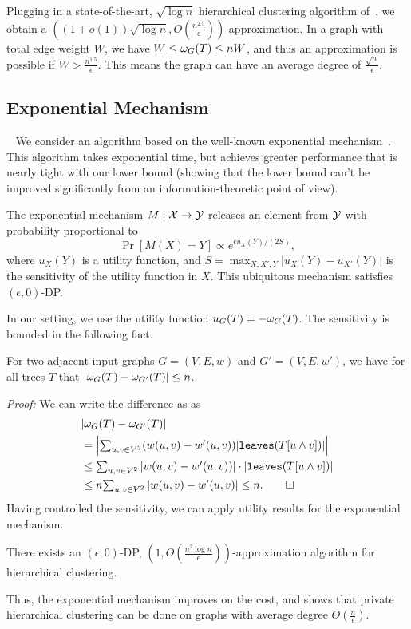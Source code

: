 Plugging in a state-of-the-art, $\sqrt{\log n}$ hierarchical clustering algorithm of~\citet{charikar2017approximate}, we obtain a $((1+o(1)) \sqrt{\log n}, \tilde{O}(\frac{n^{2.5}}{\epsilon}))$-approximation. In a graph with total edge weight $W$, we have $W \leq \omega_G(T) \leq nW$, and thus an approximation is possible if $W > \frac{n^{1.5}}{\epsilon}$. This means the graph can have an average degree of $\frac{\sqrt{n}}{\epsilon}$.

\subsection{Exponential Mechanism}~\label{sec:hc-exp}
We consider an algorithm based on the well-known exponential mechanism~\citep{mcsherry2007mechanism}. This algorithm takes exponential time, but achieves greater performance that is nearly tight with our lower bound (showing that the lower bound can't be improved significantly from an information-theoretic point of view).

The exponential mechanism $M : \mathcal{X} \rightarrow \mathcal{Y}$ releases an element from $\mathcal{Y}$ with probability proportional to 
\[
    \Pr[M(X) = Y] \propto e^{\epsilon u_X(Y) / (2S)},
\]
where $u_X(Y)$ is a utility function, and $S = \max_{X,X',Y}|u_X(Y) - u_{X'}(Y)|$ is the sensitivity of the utility function in $X$. This ubiquitous mechanism satisfies $(\epsilon, 0)$-DP. 

In our setting, we use the utility function $u_G(T) = -\omega_G(T)$.
The sensitivity is bounded in the following fact.
\begin{fact}
For two adjacent input graphs $G = (V,E,w)$ and $G' = (V,E,w')$, we have for all trees $T$ that $|\omega_{G}(T) - \omega_{G'}(T)| \leq n$.
\end{fact}
\noindent\textit{Proof:}
    We can write the difference as as 
    \begin{align*}
        &|\cost_G(T) - \cost_{G'}(T)| \\ 
        &= \textstyle{\left|\sum_{u,v \in V^2} (w(u,v) - w'(u,v))|\texttt{leaves}(T[u\wedge v])| \right|} \\
        &\leq \textstyle{\sum_{u,v \in V^2} |w(u,v) - w'(u,v))| \cdot |\texttt{leaves}(T[u\wedge v])|} \\
        &\leq n \textstyle{\sum_{u,v \in V^2} |w(u,v) - w'(u,v)| \leq n}. \hfill \qed
    \end{align*}
Having controlled the sensitivity, we can apply utility results for the exponential mechanism.
\begin{lem}\label{lem:exp-util}
There exists an $(\epsilon, 0)$-DP, $(1, O(\frac{n^2 \log n}{\epsilon}))$-approximation algorithm for hierarchical clustering.
\end{lem}

Thus, the exponential mechanism improves on the cost, and shows that private hierarchical clustering can be done on graphs with average degree $O(\frac{n}{\epsilon})$.